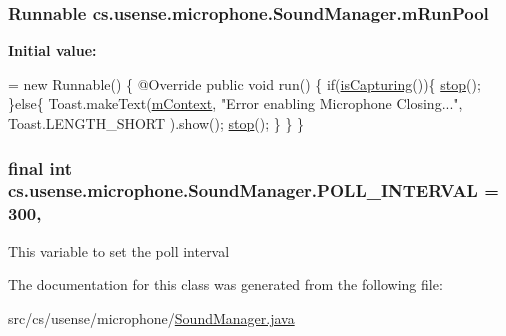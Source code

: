 \subsubsection[{m\+Run\+Pool}]{\setlength{\rightskip}{0pt plus 5cm}Runnable cs.\+usense.\+microphone.\+Sound\+Manager.\+m\+Run\+Pool\hspace{0.3cm}{\ttfamily [private]}}\label{classcs_1_1usense_1_1microphone_1_1_sound_manager_a654ce160547e8ea92271b68ebb11a6b2}
{\bfseries Initial value\+:}
\begin{DoxyCode}
= \textcolor{keyword}{new} Runnable() \{
        @Override
        \textcolor{keyword}{public} \textcolor{keywordtype}{void} run() \{
            \textcolor{keywordflow}{if}(\hyperlink{classcs_1_1usense_1_1microphone_1_1_sound_manager_a0de5a00d32015ff0df267cc54738782b}{isCapturing}())\{
                \hyperlink{classcs_1_1usense_1_1microphone_1_1_sound_manager_af050c3c4176f1b7bbc2d955ba0e7fd60}{stop}();
            \}\textcolor{keywordflow}{else}\{
                Toast.makeText(\hyperlink{classcs_1_1usense_1_1microphone_1_1_sound_manager_a5a69cb1ee55ad355470977fd94a9b190}{mContext}, \textcolor{stringliteral}{"Error enabling Microphone Closing..."}, Toast.LENGTH\_SHORT
      ).show();
                \hyperlink{classcs_1_1usense_1_1microphone_1_1_sound_manager_af050c3c4176f1b7bbc2d955ba0e7fd60}{stop}();
            \}
        \}
    \}
\end{DoxyCode}
\hypertarget{classcs_1_1usense_1_1microphone_1_1_sound_manager_a402c544cc461ed5f455b1ae97fd6cbbc}{}
\subsubsection[{P\+O\+L\+L\+\_\+\+I\+N\+T\+E\+R\+V\+A\+L}]{\setlength{\rightskip}{0pt plus 5cm}final int cs.\+usense.\+microphone.\+Sound\+Manager.\+P\+O\+L\+L\+\_\+\+I\+N\+T\+E\+R\+V\+A\+L = 300\hspace{0.3cm}{\ttfamily [static]}, {\ttfamily [private]}}\label{classcs_1_1usense_1_1microphone_1_1_sound_manager_a402c544cc461ed5f455b1ae97fd6cbbc}
This variable to set the poll interval 

The documentation for this class was generated from the following file\+:\begin{DoxyCompactItemize}
\item 
src/cs/usense/microphone/\hyperlink{_sound_manager_8java}{Sound\+Manager.\+java}\end{DoxyCompactItemize}
